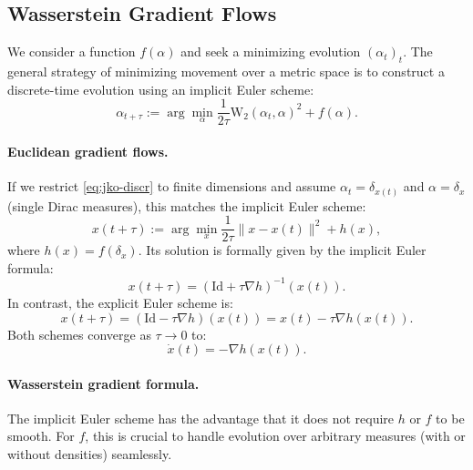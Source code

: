 \subsection{Wasserstein Gradient Flows}

We consider a function $f(\alpha)$ and seek a minimizing evolution $(\alpha_t)_t$. The general strategy of minimizing movement over a metric space is to construct a discrete-time evolution using an implicit Euler scheme:
\begin{equation}
    \alpha_{t+\tau} := \arg\min_\alpha \frac{1}{2 \tau} \mathrm{W}_2(\alpha_t, \alpha)^2 + f(\alpha). \label{eq:jko-discr}
\end{equation}

\paragraph{Euclidean gradient flows.}

If we restrict \eqref{eq:jko-discr} to finite dimensions and assume $\alpha_t = \delta_{x(t)}$ and $\alpha = \delta_x$ (single Dirac measures), this matches the implicit Euler scheme:
\begin{equation}
    x(t+\tau) := \arg\min_x \frac{1}{2 \tau} \|x - x(t)\|^2 + h(x),
\end{equation}
where $h(x) = f(\delta_x)$. Its solution is formally given by the implicit Euler formula:
\begin{equation}
    x(t+\tau) = (\mathrm{Id} + \tau \nabla h)^{-1}(x(t)).
\end{equation}
In contrast, the explicit Euler scheme is:
\begin{equation}
    x(t+\tau) = (\mathrm{Id} - \tau \nabla h)(x(t)) = x(t) - \tau \nabla h(x(t)).
\end{equation}
Both schemes converge as $\tau \to 0$ to:
\begin{equation}
    \dot{x}(t) = -\nabla h(x(t)). \label{eq:grad-flow-classical}
\end{equation}


\paragraph{Wasserstein gradient formula.}

The implicit Euler scheme has the advantage that it does not require $h$ or $f$ to be smooth. For $f$, this is crucial to handle evolution over arbitrary measures (with or without densities) seamlessly.

